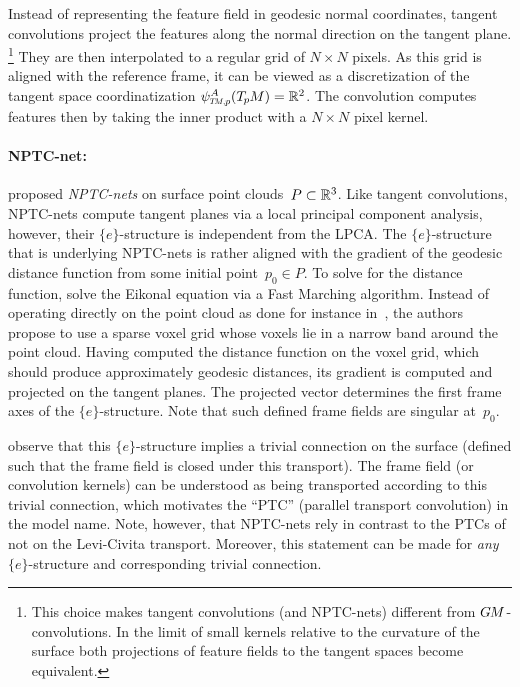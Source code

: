 Instead of representing the feature field in geodesic normal coordinates, tangent convolutions project the features along the normal direction on the tangent plane.%
\footnote{
    This choice makes tangent convolutions (and NPTC-nets) different from $G\mkern-1.4muM$-convolutions.
    In the limit of small kernels relative to the curvature of the surface both projections of feature fields to the tangent spaces become equivalent.
}
They are then interpolated to a regular grid of ${N\times N}$ pixels.
As this grid is aligned with the reference frame, it can be viewed as a discretization of the tangent space coordinatization $\psiTMp^A(\TpM) = \R^2$.
The convolution computes features then by taking the inner product with a ${N\times N}$ pixel kernel.





\paragraph{NPTC-net:}
\citet{jin2019NPTCnet} proposed \emph{NPTC-nets} on surface point clouds~${P\subset\mathbb{R}^3}$.
Like tangent convolutions, NPTC-nets compute tangent planes via a local principal component analysis,
however, their $\{e\}$-structure is independent from the LPCA.
The $\{e\}$-structure that is underlying NPTC-nets is rather aligned with the gradient of the geodesic distance function from some initial point~$p_0 \in P$.
To solve for the distance function, \citet{jin2019NPTCnet} solve the Eikonal equation via a Fast Marching algorithm.
Instead of operating directly on the point cloud as done for instance in~\cite{Crane2017HeatMethodDistance}, the authors propose to use a sparse voxel grid whose voxels lie in a narrow band around the point cloud.
Having computed the distance function on the voxel grid, which should produce approximately geodesic distances, its gradient is computed and projected on the tangent planes.
The projected vector determines the first frame axes of the $\{e\}$-structure.
Note that such defined frame fields are singular at~$p_0$.

\citet{jin2019NPTCnet} observe that this $\{e\}$-structure implies a trivial connection on the surface (defined such that the frame field is closed under this transport).
The frame field (or convolution kernels) can be understood as being transported according to this trivial connection, which motivates the ``PTC'' (parallel transport convolution) in the model name.
Note, however, that NPTC-nets rely in contrast to the PTCs of \citet{schonsheck2018parallel} not on the Levi-Civita transport.
Moreover, this statement can be made for \emph{any} $\{e\}$-structure and corresponding trivial connection.

